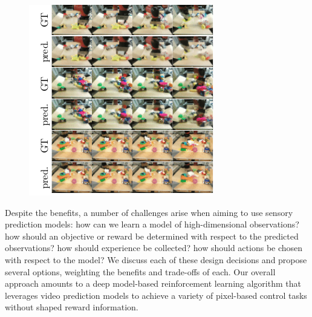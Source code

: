 

\begin{figure}[t]
\centering
\includegraphics[width=.8\columnwidth,trim={3.2mm 0 0 0},clip]{images_rfr/video_prediction.pdf}
\caption{\small{}}
\label{fig:video_prediction}
\end{figure}

Despite the benefits, a number of challenges arise when aiming to use sensory prediction models: how can we learn a model of high-dimensional observations? how should an objective or reward be determined with respect to the predicted observations? how should experience be collected? how should actions be chosen with respect to the model? We discuss each of these design decisions and propose several options, weighting the benefits and trade-offs of each.
Our overall approach amounts to a deep model-based reinforcement learning algorithm that leverages video prediction models to achieve a variety of pixel-based control tasks without shaped reward information.

